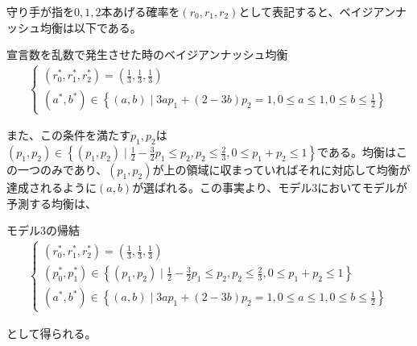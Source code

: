 \documentclass{jsarticle}
\begin{document}
守り手が指を$0,1,2$本あげる確率を$(r_0, r_1, r_2)$として表記すると、ベイジアンナッシュ均衡は以下である。
\begin{itembox}[l]{宣言数を乱数で発生させた時のベイジアンナッシュ均衡}
\begin{align}
\begin{cases}(r_0^*, r_1^*, r_2^*) = (\frac{1}{3}, \frac{1}{3}, \frac{1}{3}) \\[7pt]
(a^*, b^*) \in \left\{ (a,b) \mid 3ap_1 + (2-3b)p_2 = 1, 0\leq a \leq1, 0\leq b \leq \frac{1}{2} \right\}
\end{cases}
\end{align}
\end{itembox}
また、この条件を満たす$p_1, p_2$は$(p_1, p_2) \in \left\{ (p_1, p_2) \mid \frac{1}{2} - \frac{3}{2}p_1 \leq p_2, p_2 \leq \frac{2}{3}, 0\leq p_1 + p_2 \leq 1 \right\}$である。均衡はこの一つのみであり、$(p_1,p_2)$が上の領域に収まっていればそれに対応して均衡が達成されるように$(a, b)$が選ばれる。この事実より、モデル3においてモデルが予測する均衡は、
\begin{itembox}[l]{モデル3の帰結}
\begin{align}
\begin{cases}(r_0^*, r_1^*, r_2^*) = (\frac{1}{3}, \frac{1}{3}, \frac{1}{3}) \\[7pt]
(p_0^*, p_1^*) \in \left\{ (p_1, p_2) \mid \frac{1}{2} - \frac{3}{2}p_1 \leq p_2, p_2 \leq \frac{2}{3}, 0\leq p_1 + p_2 \leq 1 \right\} \\[7pt]
(a^*, b^*) \in \left\{ (a,b) \mid 3ap_1 + (2-3b)p_2 = 1, 0\leq a \leq1, 0\leq b \leq \frac{1}{2} \right\}
\end{cases}
\end{align}
\end{itembox}
として得られる。
\end{document}

